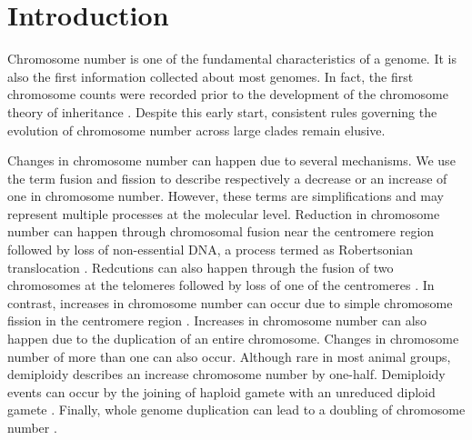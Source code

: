 \section{Introduction}

Chromosome number is one of the fundamental characteristics of a genome.
It is also the first information collected about most genomes. 
In fact, the first chromosome counts were recorded prior to the development of the chromosome theory of inheritance \citep{flemming1882}.
Despite this early start, consistent rules governing the evolution of chromosome number across large clades remain elusive. 

Changes in chromosome number can happen due to several mechanisms.
We use the term fusion and fission to describe respectively a decrease or an increase of one in chromosome number.
However, these terms are simplifications and may represent multiple processes at the molecular level.
Reduction in chromosome number can happen through chromosomal fusion near the centromere region followed by loss of non-essential DNA, a process termed as Robertsonian translocation \citep{garagna1995}. 
Redcutions can also happen through the fusion of two chromosomes at the telomeres followed by loss of one of the centromeres \citep{gordon2011mechanisms, miga2016}. %
In contrast, increases in chromosome number can occur due to simple chromosome fission in the centromere region \citep{moretti1984}.
Increases in chromosome number can also happen due to the duplication of an entire chromosome.
Changes in chromosome number of more than one can also occur.
Although rare in most animal groups, demiploidy describes an increase chromosome number by one-half. 
Demiploidy events can occur by the joining of haploid gamete with an unreduced diploid gamete \citep{hornsey1973}.
Finally, whole genome duplication can lead to a doubling of chromosome number \citep{beccak1970}.

